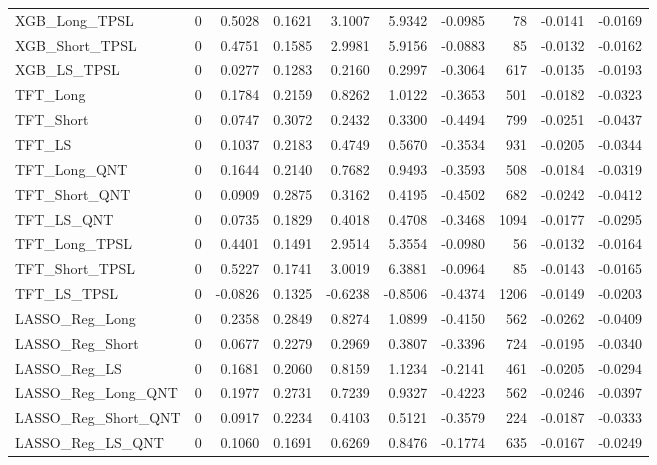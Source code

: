\begin{tabular}{llrrrrrrrr}
\cline{1-10}
XGB\_Long\_TPSL & 0 & 0.5028 & 0.1621 & 3.1007 & 5.9342 & -0.0985 & 78 & -0.0141 & -0.0169 \\
\cline{1-10}
XGB\_Short\_TPSL & 0 & 0.4751 & 0.1585 & 2.9981 & 5.9156 & -0.0883 & 85 & -0.0132 & -0.0162 \\
\cline{1-10}
XGB\_LS\_TPSL & 0 & 0.0277 & 0.1283 & 0.2160 & 0.2997 & -0.3064 & 617 & -0.0135 & -0.0193 \\
\cline{1-10}
TFT\_Long & 0 & 0.1784 & 0.2159 & 0.8262 & 1.0122 & -0.3653 & 501 & -0.0182 & -0.0323 \\
\cline{1-10}
TFT\_Short & 0 & 0.0747 & 0.3072 & 0.2432 & 0.3300 & -0.4494 & 799 & -0.0251 & -0.0437 \\
\cline{1-10}
TFT\_LS & 0 & 0.1037 & 0.2183 & 0.4749 & 0.5670 & -0.3534 & 931 & -0.0205 & -0.0344 \\
\cline{1-10}
TFT\_Long\_QNT & 0 & 0.1644 & 0.2140 & 0.7682 & 0.9493 & -0.3593 & 508 & -0.0184 & -0.0319 \\
\cline{1-10}
TFT\_Short\_QNT & 0 & 0.0909 & 0.2875 & 0.3162 & 0.4195 & -0.4502 & 682 & -0.0242 & -0.0412 \\
\cline{1-10}
TFT\_LS\_QNT & 0 & 0.0735 & 0.1829 & 0.4018 & 0.4708 & -0.3468 & 1094 & -0.0177 & -0.0295 \\
\cline{1-10}
TFT\_Long\_TPSL & 0 & 0.4401 & 0.1491 & 2.9514 & 5.3554 & -0.0980 & 56 & -0.0132 & -0.0164 \\
\cline{1-10}
TFT\_Short\_TPSL & 0 & 0.5227 & 0.1741 & 3.0019 & 6.3881 & -0.0964 & 85 & -0.0143 & -0.0165 \\
\cline{1-10}
TFT\_LS\_TPSL & 0 & -0.0826 & 0.1325 & -0.6238 & -0.8506 & -0.4374 & 1206 & -0.0149 & -0.0203 \\
\cline{1-10}
LASSO\_Reg\_Long & 0 & 0.2358 & 0.2849 & 0.8274 & 1.0899 & -0.4150 & 562 & -0.0262 & -0.0409 \\
\cline{1-10}
LASSO\_Reg\_Short & 0 & 0.0677 & 0.2279 & 0.2969 & 0.3807 & -0.3396 & 724 & -0.0195 & -0.0340 \\
\cline{1-10}
LASSO\_Reg\_LS & 0 & 0.1681 & 0.2060 & 0.8159 & 1.1234 & -0.2141 & 461 & -0.0205 & -0.0294 \\
\cline{1-10}
LASSO\_Reg\_Long\_QNT & 0 & 0.1977 & 0.2731 & 0.7239 & 0.9327 & -0.4223 & 562 & -0.0246 & -0.0397 \\
\cline{1-10}
LASSO\_Reg\_Short\_QNT & 0 & 0.0917 & 0.2234 & 0.4103 & 0.5121 & -0.3579 & 224 & -0.0187 & -0.0333 \\
\cline{1-10}
LASSO\_Reg\_LS\_QNT & 0 & 0.1060 & 0.1691 & 0.6269 & 0.8476 & -0.1774 & 635 & -0.0167 & -0.0249 \\

\end{tabular}
